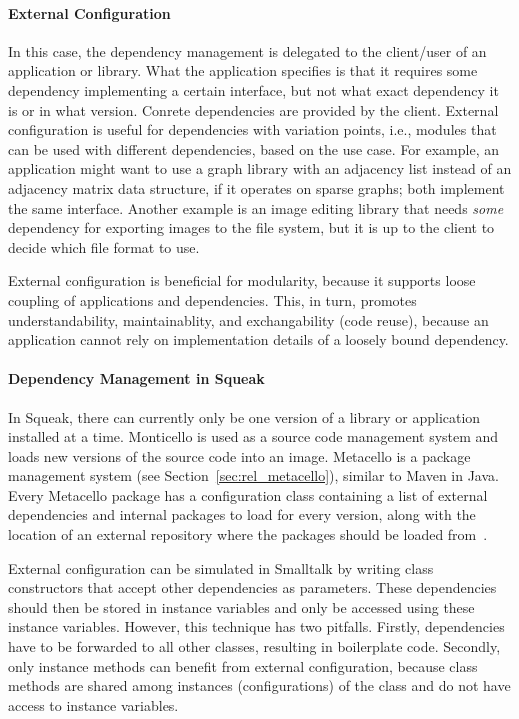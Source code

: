 \paragraph{External Configuration}
In this case, the dependency management is delegated to the client/user of an application or library. What the application specifies is that it requires some dependency implementing a certain interface, but not what exact dependency it is or in what version. Conrete dependencies are provided by the client. External configuration is useful for dependencies with variation points, i.e., modules that can be used with different dependencies, based on the use case. For example, an application might want to use a graph library with an adjacency list instead of an adjacency matrix data structure, if it operates on sparse graphs; both implement the same interface. Another example is an image editing library that needs \emph{some} dependency for exporting images to the file system, but it is up to the client to decide which file format to use. 

External configuration is beneficial for modularity, because it supports loose coupling of applications and dependencies. This, in turn, promotes understandability, maintainablity, and exchangability (code reuse), because an application cannot rely on implementation details of a loosely bound dependency.

\paragraph{Dependency Management in Squeak}
In Squeak, there can currently only be one version of a library or application installed at a time. Monticello is used as a source code management system and loads new versions of the source code into an image. Metacello is a package management system (see Section~\ref{sec:rel_metacello}), similar to Maven in Java. Every Metacello package has a configuration class containing a list of external dependencies and internal packages to load for every version, along with the location of an external repository where the packages should be loaded from~\cite{metacellodraft}.

External configuration can be simulated in Smalltalk by writing class constructors that accept other dependencies as parameters. These dependencies should then be stored in instance variables and only be accessed using these instance variables. However, this technique has two pitfalls. Firstly, dependencies have to be forwarded to all other classes, resulting in boilerplate code. Secondly, only instance methods can benefit from external configuration, because class methods are shared among instances (configurations) of the class and do not have access to instance variables.

